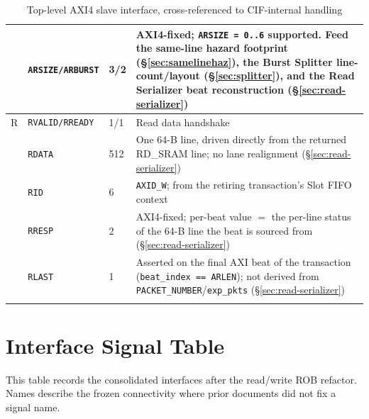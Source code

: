 \begin{longtable}{p{1.3cm}p{3.2cm}p{1.6cm}p{9.5cm}}
   & \texttt{ARSIZE/ARBURST}  & 3/2 & AXI4-fixed; \texttt{ARSIZE = 0..6} supported. Feed the same-line hazard footprint (\S\ref{sec:samelinehaz}), the Burst Splitter line-count/layout (\S\ref{sec:splitter}), and the Read Serializer beat reconstruction (\S\ref{sec:read-serializer})\\
\midrule
R  & \texttt{RVALID/RREADY}   & 1/1 & Read data handshake\\
   & \texttt{RDATA}           & 512 & One 64-B line, driven directly from the returned RD\_SRAM line; no lane realignment (\S\ref{sec:read-serializer})\\
   & \texttt{RID}             & 6   & \texttt{AXID\_W}; from the retiring transaction's Slot FIFO context\\
   & \texttt{RRESP}           & 2   & AXI4-fixed; per-beat value $=$ the per-line status of the 64-B line the beat is sourced from (\S\ref{sec:read-serializer})\\
   & \texttt{RLAST}           & 1   & Asserted on the final AXI beat of the transaction (\texttt{beat\_index == ARLEN}); not derived from \texttt{PACKET\_NUMBER}/\texttt{exp\_pkts} (\S\ref{sec:read-serializer})\\
\bottomrule
\caption{Top-level AXI4 slave interface, cross-referenced to CIF-internal handling}
\end{longtable}

\section{Interface Signal Table}
\label{sec:interfaces}

This table records the consolidated interfaces after the read/write ROB
refactor.  Names describe the frozen connectivity where prior documents did
not fix a signal name.

